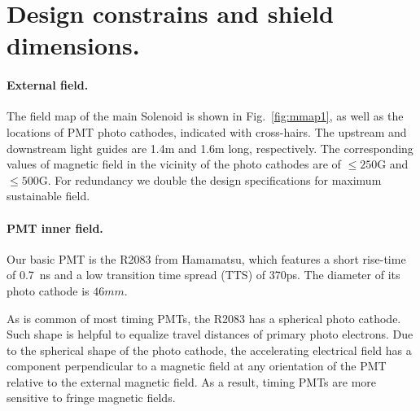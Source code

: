 \documentclass[12pt]{article}
\begin{document}
\section{Design constrains and shield dimensions.}

\paragraph{External field.}
The  field map of the main Solenoid is shown in  Fig.~\ref{fig:mmap1}, as well as  the 
locations of PMT photo cathodes, indicated with cross-hairs.
The   upstream and downstream light guides  are  1.4m and 1.6m long, respectively.   
The corresponding values of magnetic  field in the vicinity of the photo cathodes  
are of $\leq 250$G and $\leq 500$G. 
For  redundancy  we double the design specifications for maximum sustainable field.
\paragraph{PMT inner field.}
Our basic  PMT is  the R2083 from Hamamatsu, which
features a short rise-time of 0.7~ns  and a low transition time spread (TTS) of 370ps.
The diameter of its photo cathode is $46mm$. 

As is common of most timing PMTs, the R2083 has a spherical photo cathode. 
Such shape is helpful to  equalize travel distances of primary photo electrons. 
Due to the spherical shape of the photo cathode, the accelerating electrical field has a component perpendicular to a magnetic field at any orientation of the PMT relative to the external
magnetic field. As a result, timing PMTs are more sensitive to fringe  magnetic fields.
\end{document}
